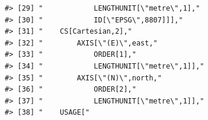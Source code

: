 \documentclass[
]{book}
\begin{document}
\begin{verbatim}
#> [29] "            LENGTHUNIT[\"metre\",1],"                                                                                                                                                                                                                                           
#> [30] "            ID[\"EPSG\",8807]]],"                                                                                                                                                                                                                                               
#> [31] "    CS[Cartesian,2],"                                                                                                                                                                                                                                                           
#> [32] "        AXIS[\"(E)\",east,"                                                                                                                                                                                                                                                     
#> [33] "            ORDER[1],"                                                                                                                                                                                                                                                          
#> [34] "            LENGTHUNIT[\"metre\",1]],"                                                                                                                                                                                                                                          
#> [35] "        AXIS[\"(N)\",north,"                                                                                                                                                                                                                                                    
#> [36] "            ORDER[2],"                                                                                                                                                                                                                                                          
#> [37] "            LENGTHUNIT[\"metre\",1]],"                                                                                                                                                                                                                                          
#> [38] "    USAGE["                                                                                                                                                                                                                                                                     

\end{verbatim}
\end{document}
